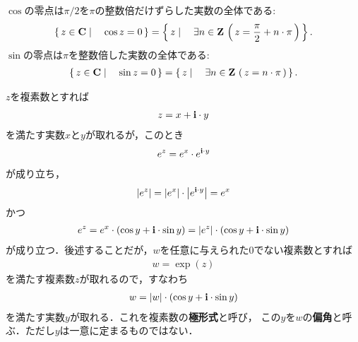 	\begin{screen}
		\begin{thm}[余弦と正弦の零点]
			$\cos$の零点は$\pi/2$を$\pi$の整数倍だけずらした実数の全体である:
			\begin{align}
				\left\{\, z \in \mathbf{C} \mid \quad \cos{z} = 0\, \right\}
				= \left\{\, z \mid \quad \exists n \in \mathbf{Z}\, \left(\, z = \frac{\pi}{2} + n \cdot \pi\, \right)\, \right\}.
			\end{align}
			$\sin$の零点は$\pi$を整数倍した実数の全体である:
			\begin{align}
				\left\{\, z \in \mathbf{C} \mid \quad \sin{z} = 0\, \right\}
				= \left\{\, z \mid \quad \exists n \in \mathbf{Z}\, \left(\, z = n \cdot \pi\, \right)\, \right\}.
			\end{align}
		\end{thm}
	\end{screen}
	
	$z$を複素数とすれば
	\begin{align}
		z = x + \mathbf{i} \cdot y
	\end{align}
	を満たす実数$x$と$y$が取れるが，このとき
	\begin{align}
		e^z = e^x \cdot e^{\mathbf{i} \cdot y}
	\end{align}
	が成り立ち，
	\begin{align}
		\left|e^z\right| = \left|e^x\right| \cdot \left|e^{\mathbf{i} \cdot y}\right| = e^x
	\end{align}
	かつ
	\begin{align}
		e^z = e^x \cdot (\cos{y} + \mathbf{i} \cdot \sin{y}) = \left|e^z\right| \cdot (\cos{y} + \mathbf{i} \cdot \sin{y})
	\end{align}
	が成り立つ．後述することだが，$w$を任意に与えられた$0$でない複素数とすれば
	\begin{align}
		w = \exp{(z)}
	\end{align}
	を満たす複素数$z$が取れるので，すなわち
	\begin{align}
		w = |w| \cdot (\cos{y} + \mathbf{i} \cdot \sin{y})
	\end{align}
	を満たす実数$y$が取れる．これを複素数の{\bf 極形式}と呼び，
	この$y$を$w$の{\bf 偏角}と呼ぶ．ただし$y$は一意に定まるものではない．